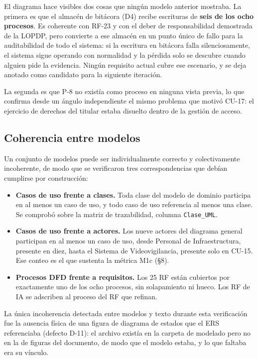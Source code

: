 El diagrama hace visibles dos cosas que ning\'un modelo anterior mostraba. La primera es que el almac\'en de bit\'acora (D4) recibe escrituras de \textbf{seis de los ocho procesos}. Es coherente con RF-23 y con el deber de responsabilidad demostrada de la LOPDP, pero convierte a ese almac\'en en un punto \'unico de fallo para la auditabilidad de todo el sistema: si la escritura en bit\'acora falla silenciosamente, el sistema sigue operando con normalidad y la p\'erdida solo se descubre cuando alguien pide la evidencia. Ning\'un requisito actual cubre ese escenario, y se deja anotado como candidato para la siguiente iteraci\'on.

La segunda es que P-8 no exist\'ia como proceso en ninguna vista previa, lo que confirma desde un \'angulo independiente el mismo problema que motiv\'o CU-17: el ejercicio de derechos del titular estaba disuelto dentro de la gesti\'on de acceso.

\subsection{Coherencia entre modelos}

Un conjunto de modelos puede ser individualmente correcto y colectivamente incoherente, de modo que se verificaron tres correspondencias que deb\'ian cumplirse por construcci\'on:

\begin{itemize}
\item \textbf{Casos de uso frente a clases.} Toda clase del modelo de dominio participa en al menos un caso de uso, y todo caso de uso referencia al menos una clase. Se comprob\'o sobre la matriz de trazabilidad, columna \texttt{Clase\_UML}.
\item \textbf{Casos de uso frente a actores.} Los nueve actores del diagrama general participan en al menos un caso de uso, desde Personal de Infraestructura, presente en diez, hasta el Sistema de Videovigilancia, presente solo en CU-15. Ese conteo es el que sustenta la m\'etrica M1c (\S8).
\item \textbf{Procesos DFD frente a requisitos.} Los 25 RF est\'an cubiertos por exactamente uno de los ocho procesos, sin solapamiento ni hueco. Los RF de IA se adscriben al proceso del RF que refinan.
\end{itemize}

La \'unica incoherencia detectada entre modelos y texto durante esta verificaci\'on fue la ausencia f\'isica de una figura de diagrama de estados que el ERS referenciaba (defecto D-11): el archivo exist\'ia en la carpeta de modelado pero no en la de figuras del documento, de modo que el modelo estaba, y lo que faltaba era su v\'inculo.
